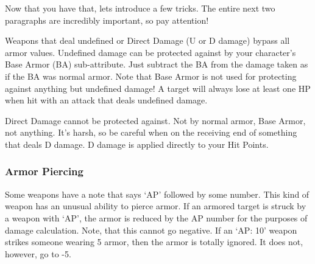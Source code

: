 \documentclass[twoside]{book}
\begin{document}
  
    {  
    Now that you have that, lets introduce a few tricks.
               The entire next two paragraphs are incredibly important,
               so pay attention! 
    }
  
    {  
    Weapons that deal undefined or Direct Damage (U or D
               damage) bypass all armor values. Undefined damage can be
               protected against by your character's Base Armor
               (BA) sub-attribute. Just subtract the BA from the damage
               taken as if the BA was normal armor. Note that Base Armor
               is not used for protecting against anything but undefined
               damage! A target will always lose at least one HP when hit
               with an attack that deals undefined damage. 
    }
  
    {  
    Direct Damage cannot be protected against. Not by
               normal armor, Base Armor, not anything. It's harsh,
               so be careful when on the receiving end of something that
               deals D damage. D damage is applied directly to your Hit
               Points. 
    }
  
    

\subsubsection{Armor Piercing}
    
    {  
    Some weapons have a note that says
                 `AP' followed by some number. This kind of
                 weapon has an unusual ability to pierce armor. If an
                 armored target is struck by a weapon with
                 `AP', the armor is reduced by the AP number
                 for the purposes of damage calculation. Note, that this
                 cannot go negative. If an `AP: 10' weapon
                 strikes someone wearing 5 armor, then the armor is
                 totally ignored. It does not, however, go to -5. 
    }
  
  

  
\end{document}
